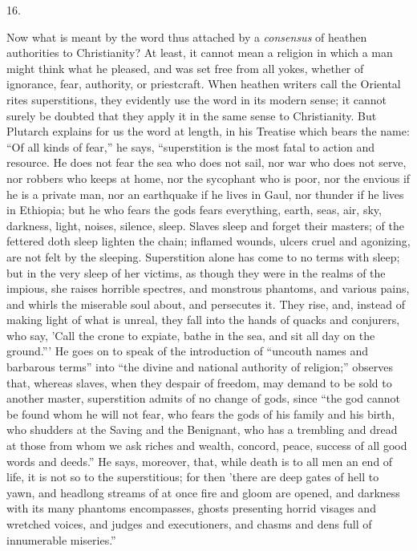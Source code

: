 16.

Now what is meant by the word thus attached by a \emph{consensus}
of heathen authorities to Christianity? At least, it
cannot mean a religion in which a man might think what he
pleased, and was set free from all yokes, whether of
ignorance, fear, authority, or priestcraft. When heathen
writers call the Oriental rites superstitions, they
evidently use the word in its modern sense; it cannot
surely be doubted that they apply it in the same sense to
Christianity. But Plutarch explains for us the word at
length, in his Treatise which bears the name: ``Of
all kinds of fear,'' he says, ``superstition is
the most fatal to action and resource. He does not fear
the sea who does not sail, nor war who does not serve,
nor robbers who keeps at home, nor the sycophant who is
poor, nor the envious if he is a private man, nor an
earthquake if he lives in Gaul, nor thunder if he lives
in Ethiopia; but he who fears the gods fears everything,
earth, seas, air, sky, darkness, light, noises, silence,
sleep. Slaves sleep and forget their masters; of the
fettered doth sleep lighten the chain; inflamed wounds,
ulcers cruel and agonizing, are not felt by the sleeping.
Superstition alone has come to no terms with sleep; but
in the very sleep of her victims, as though they were in
the realms of the impious, she raises horrible spectres,
and monstrous phantoms, and various pains, and whirls the
miserable soul about, and persecutes it. They rise, and,
instead of making light of what is unreal, they fall into
the hands of quacks and conjurers, who say, 'Call the
crone to expiate, bathe in the sea, and sit all day on
the ground.''' He goes on to speak of the
introduction of ``uncouth names and barbarous
terms'' into ``the divine and national authority
of religion;'' observes that, whereas slaves, when
they despair of freedom, may demand to be sold to another
master, superstition admits of no change of gods, since
``the god cannot be found whom he will not fear, who
fears the gods of his family and his birth, who shudders
at the Saving and the Benignant, who has a trembling and
dread at those from whom we ask riches and wealth,
concord, peace, success of all good words and
deeds.'' He says, moreover, that, while death is to
all men an end of life, it is not so to the
superstitious; for then 'there are deep gates of hell to
yawn, and headlong streams of at once fire and gloom are
opened, and darkness with its many phantoms encompasses,
ghosts presenting horrid visages and wretched voices, and
judges and executioners, and chasms and dens full of
innumerable miseries.''

